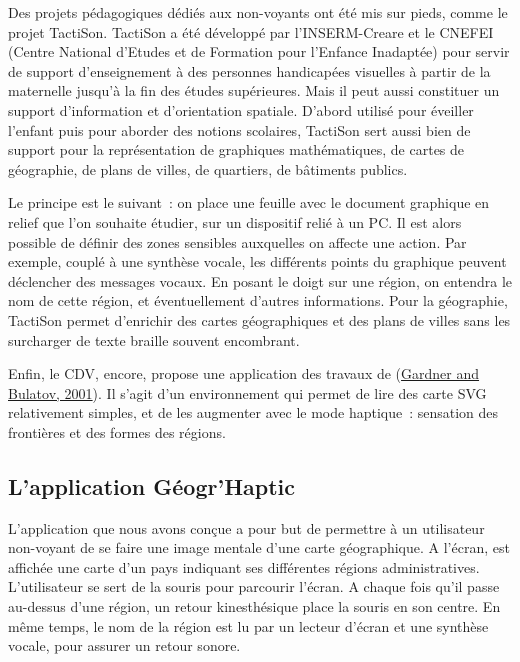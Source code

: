 \documentclass[
]{book}
\begin{document}
Des projets pédagogiques dédiés aux non-voyants ont été mis sur pieds,
comme le projet TactiSon. TactiSon a été développé par l'INSERM-Creare et le
CNEFEI (Centre National d'Etudes et de Formation pour l'Enfance Inadaptée)
pour servir de support d'enseignement à des personnes handicapées visuelles à
partir de la maternelle jusqu'à la fin des études supérieures. Mais il peut
aussi constituer un support d'information et d'orientation spatiale. D'abord
utilisé pour éveiller l'enfant puis pour aborder des notions scolaires,
TactiSon sert aussi bien de support pour la représentation de graphiques
mathématiques, de cartes de géographie, de plans de villes, de quartiers, de
bâtiments publics.

Le principe est le suivant~: on place une feuille avec le document
graphique en relief que l'on souhaite étudier, sur un dispositif relié à un
PC. Il est alors possible de définir des zones sensibles auxquelles on
affecte une action. Par exemple, couplé à une synthèse vocale, les différents
points du graphique peuvent déclencher des messages vocaux. En posant le
doigt sur une région, on entendra le nom de cette région, et éventuellement
d'autres informations. Pour la géographie, TactiSon permet d'enrichir des
cartes géographiques et des plans de villes sans les surcharger de texte
braille souvent encombrant.

Enfin, le CDV, encore, propose une application des travaux
de (\protect\hyperlink{ref-gardner2001smart}{Gardner and Bulatov, 2001}). Il s'agit d'un environnement qui permet de lire
des carte SVG relativement simples, et de les augmenter avec le mode
haptique~: sensation des frontières et des formes des régions.

\hypertarget{lapplication-guxe9ogrhaptic}{%
\subsection{L'application Géogr'Haptic}\label{lapplication-guxe9ogrhaptic}}

L'application que nous avons conçue a pour but de permettre à un
utilisateur non-voyant de se faire une image mentale d'une carte
géographique. A l'écran, est affichée une carte d'un pays indiquant ses
différentes régions administratives. L'utilisateur se sert de la souris pour
parcourir l'écran. A chaque fois qu'il passe au-dessus d'une région, un
retour kinesthésique place la souris en son centre. En même temps, le nom de
la région est lu par un lecteur d'écran et une synthèse vocale, pour assurer
un retour sonore.
\end{document}
